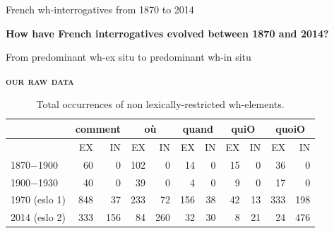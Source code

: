 \documentclass[lesson_slides]{subfiles}
\begin{document}
\begin{frame}[c]{French wh-interrogatives from 1870 to 2014}

    \begin{center}
        \textbf{How have French interrogatives evolved between 1870 and 2014?}
    \end{center}
  
\end{frame}
\begin{frame}[c]{From predominant wh-ex situ to predominant wh-in situ}

\textbf{\textsc{our raw data}}

\begin{table}[H]
    \centering
    \small
    \begin{adjustbox}
        \begin{tabular}{l|rr|rr|rr|rr|rr}
        {} & \multicolumn{2}{c}{comment}  & \multicolumn{2}{c}{où} & \multicolumn{2}{c}{quand} & \multicolumn{2}{c}{quiO}& \multicolumn{2}{c}{quoiO}\\
        \hline
        {} & EX & IN & EX & IN & EX & IN & EX & IN & EX & IN\\
        1870$-$1900 & 60 & 0 & 102 & 0 & 14 & 0 & 15 & 0 & 36 & 0\\
        1900$-$1930 & 40 & 0 & 39 & 0 & 4 & 0 & 9 & 0 & 17 & 0\\
        1970 (eslo 1) & 848 & 37 & 233 & 72 & 156 & 38 & 42 & 13 & 333 & 198\\
        2014 (eslo 2) & 333 & 156 & 84 & 260 & 32 & 30 & 8 & 21 & 24 & 476 \\
        \hline
        \end{tabular}
    \end{adjustbox}
\caption{\label{tab:samp3}Total occurrences of non lexically-restricted wh-elements.}
\end{table}
  
\end{frame}
\end{document}
